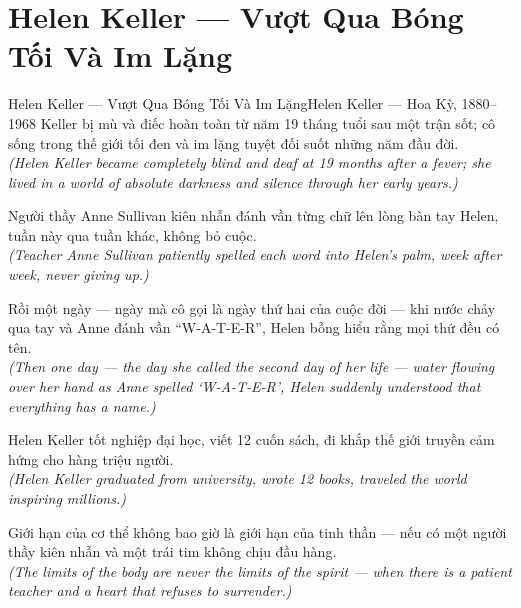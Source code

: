 \section{Helen Keller --- Vượt Qua Bóng Tối Và Im Lặng}
\begin{truyen}{Helen Keller --- Vượt Qua Bóng Tối Và Im Lặng}{Helen Keller --- Hoa Kỳ, 1880--1968}
 Keller bị mù và điếc hoàn toàn từ năm 19 tháng tuổi sau một trận sốt; cô sống trong thế giới tối đen và im lặng tuyệt đối suốt những năm đầu đời.\\[4pt]
\textit{(Helen Keller became completely blind and deaf at 19 months after a fever; she lived in a world of absolute darkness and silence through her early years.)}

Người thầy Anne Sullivan kiên nhẫn đánh vần từng chữ lên lòng bàn tay Helen, tuần này qua tuần khác, không bỏ cuộc.\\[4pt]
\textit{(Teacher Anne Sullivan patiently spelled each word into Helen's palm, week after week, never giving up.)}

Rồi một ngày --- ngày mà cô gọi là ngày thứ hai của cuộc đời --- khi nước chảy qua tay và Anne đánh vần ``W-A-T-E-R'', Helen bỗng hiểu rằng mọi thứ đều có tên.\\[4pt]
\textit{(Then one day --- the day she called the second day of her life --- water flowing over her hand as Anne spelled `W-A-T-E-R', Helen suddenly understood that everything has a name.)}

Helen Keller tốt nghiệp đại học, viết 12 cuốn sách, đi khắp thế giới truyền cảm hứng cho hàng triệu người.\\[4pt]
\textit{(Helen Keller graduated from university, wrote 12 books, traveled the world inspiring millions.)}

\end{truyen}
\begin{baihoc}
  Giới hạn của cơ thể không bao giờ là giới hạn của tinh thần --- nếu có một người thầy kiên nhẫn và một trái tim không chịu đầu hàng.\\[4pt]
  \textit{(The limits of the body are never the limits of the spirit --- when there is a patient teacher and a heart that refuses to surrender.)}
\end{baihoc}

